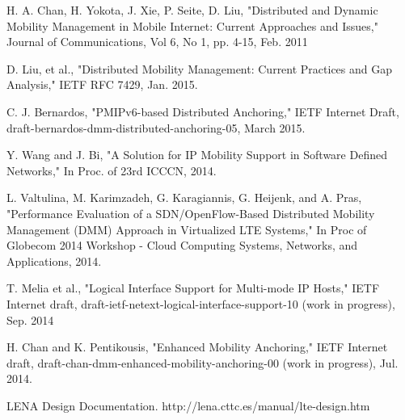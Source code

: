 \documentclass[runningheads,a4paper]{llncs}
\begin{document}
\begin{thebibliography}{4}

 H. A. Chan, H. Yokota, J. Xie, P. Seite, D. Liu, "Distributed and Dynamic Mobility Management in Mobile Internet: Current Approaches and Issues," Journal of Communications, Vol 6, No 1, pp. 4-15, Feb. 2011

 D. Liu, et al., "Distributed Mobility Management: Current Practices and Gap Analysis," IETF RFC 7429, Jan. 2015.

 C. J. Bernardos, "PMIPv6-based Distributed Anchoring," IETF Internet Draft, draft-bernardos-dmm-distributed-anchoring-05, March 2015.

 Y. Wang and J. Bi, "A Solution for IP Mobility Support in Software Defined Networks," In Proc. of 23rd ICCCN, 2014.

 L. Valtulina, M. Karimzadeh, G. Karagiannis, G. Heijenk, and A. Pras, "Performance Evaluation of a SDN/OpenFlow-Based Distributed Mobility Management (DMM) Approach in Virtualized LTE Systems," In Proc of Globecom 2014 Workshop - Cloud Computing Systems, Networks, and Applications, 2014.

 T. Melia et al., "Logical Interface Support for Multi-mode IP Hosts," IETF Internet draft, draft-ietf-netext-logical-interface-support-10 (work in progress), Sep. 2014

 H. Chan and K. Pentikousis, "Enhanced Mobility Anchoring," IETF Internet draft, draft-chan-dmm-enhanced-mobility-anchoring-00 (work in progress), Jul. 2014.

 LENA Design Documentation. http://lena.cttc.es/manual/lte-design.htm

\end{thebibliography}
\end{document}
